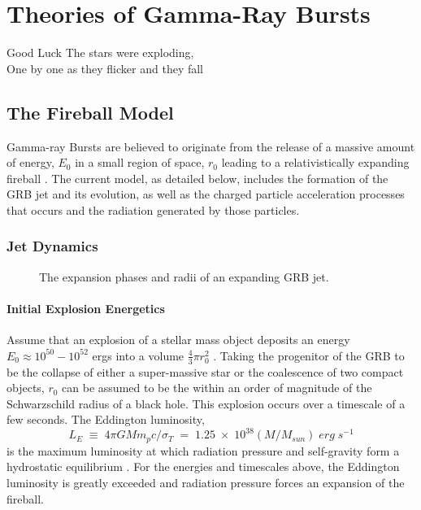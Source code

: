 \chapter{Theories of Gamma-Ray Bursts}
\label{ch:theoryGRB}
\begin{chapterquote}{Good Luck}
The stars were exploding,\\
One by one as they flicker and they fall
\end{chapterquote}

\section{The Fireball Model}
\label{sec:fbm}
Gamma-ray Bursts are believed to originate from the release of a
massive amount of energy, $E_0$ in a small region of space, $ r_0$
leading to a relativistically expanding fireball
\cite{Cavallo:1978,Goodman:1986,Paczynski:1986}. The current model, as
detailed below, includes the formation of the GRB jet and its evolution, as
well as the charged particle acceleration processes that occurs and the
radiation generated by those particles.

\subsection{Jet Dynamics}
\begin{figure}[h]
  \centering
  \caption{The expansion phases and radii of an expanding GRB jet.}
\end{figure}


\subsubsection{Initial Explosion Energetics}
Assume that an explosion of a stellar mass object deposits an energy
$E_0 \approx 10^{50}-10^{52}$ ergs into a volume $\frac{4}{3}\pi
r_0^2$ \cite{Kobayashi:1999}. Taking the progenitor of the GRB to be
the collapse of either a super-massive star or the coalescence of two
compact objects, $r_0$ can be assumed to be the within an order of
magnitude of the Schwarzschild radius of a black hole. This explosion
occurs over a timescale of a few seconds. The Eddington luminosity,
\begin{equation}
  \label{eq:eddington}
  L_E\;\equiv\;4\pi G M m_p c/\sigma_T\;=\; 1.25\;\times\;10^{38}(M/M_{sun})\;erg\;s^{-1} %
\end{equation}
is the maximum luminosity at which radiation pressure and self-gravity
form a hydrostatic equilibrium \cite{rybicki:1979}. For the energies and
timescales above, the Eddington luminosity is greatly exceeded and radiation
pressure forces an expansion of the fireball.


